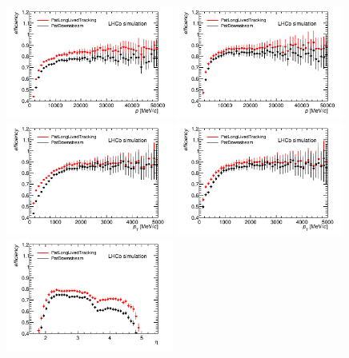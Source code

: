 \begin{figure}[tbph]
\begin{center}
\includegraphics[width = 0.49\textwidth]{figures/EffPatLLT/compare/BJpsiKSP.png} 
\includegraphics[width = 0.49\textwidth]{figures/EffPatLLT/compare/BJpsiKSFromBDP.png}
\includegraphics[width = 0.49\textwidth]{figures/EffPatLLT/compare/BJpsiKSPt.png} 
\includegraphics[width = 0.49\textwidth]{figures/EffPatLLT/compare/BJpsiKSFromBDPt.png}
\includegraphics[width = 0.49\textwidth]{figures/EffPatLLT/compare/BJpsiKSEta.png} 

\end{center}
\end{figure}
